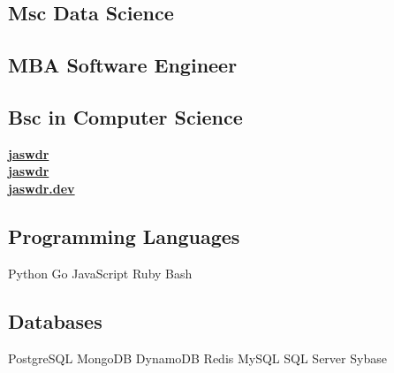 \documentclass[a4paper]{MagicalCV}
\begin{document}
\lastupdated


\begin{minipage}[t]{0.33\textwidth} 


\subsection{Msc Data Science}
\vspace{\topsep} %
\sectionsep

\subsection{MBA Software Engineer}
\sectionsep

\subsection{Bsc in Computer Science}
\sectionsep


 \href{https://github.com/jaswdr}{\bf jaswdr} \\
 \href{https://www.linkedin.com/in/jaswdr/}{\bf jaswdr} \\
 \href{https://jaswdr.dev/}{\bf jaswdr.dev}
\sectionsep


\subsection{Programming Languages}
Python \textbullet{} Go \textbullet{} JavaScript \textbullet{} Ruby \textbullet{} Bash
\sectionsep

\subsection{Databases}
PostgreSQL \textbullet{} MongoDB \textbullet{} DynamoDB \textbullet{} Redis \textbullet{} MySQL \textbullet{} SQL Server \textbullet{} Sybase
\sectionsep


\end{minipage}
\end{document}
